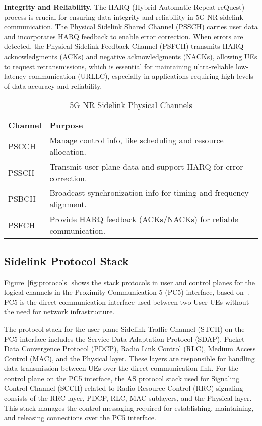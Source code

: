 \textbf{Integrity and Reliability.} The HARQ (Hybrid Automatic Repeat reQuest) process is crucial for ensuring data integrity and reliability in 5G NR sidelink communication. The Physical Sidelink Shared Channel (PSSCH) carries user data and incorporates HARQ feedback to enable error correction. When errors are detected, the Physical Sidelink Feedback Channel (PSFCH) transmits HARQ acknowledgments (ACKs) and negative acknowledgments (NACKs), allowing UEs to request retransmissions, which is essential for maintaining ultra-reliable low-latency communication (URLLC), especially in applications requiring high levels of data accuracy and reliability.

\begin{table}[t!]
\centering
\caption{5G NR Sidelink Physical Channels}
\begin{tabular}{|l|m{5.5cm}|}
\hline
\textbf{Channel} & \textbf{Purpose} \\
\hline
PSCCH & Manage control info, like scheduling and resource allocation. \\
\hline
PSSCH & Transmit user-plane data and support HARQ for error correction. \\
\hline
PSBCH & Broadcast synchronization info for timing and frequency alignment. \\
\hline
PSFCH & Provide HARQ feedback (ACKs/NACKs) for reliable communication. \\
\hline
\end{tabular} \label{tab:phy}
\end{table}

\subsection{Sidelink Protocol Stack} \label{sec:protocol}

Figure~\ref{fig:protocols} shows the stack protocols in user and control planes for the logical channels in the Proximity Communication 5 (PC5) interface, based on~\cite{3gpp.37.985}. PC5 is the direct communication interface used between two User UEs without the need for network infrastructure.

The protocol stack for the user-plane Sidelink Traffic Channel (STCH) on the PC5 interface includes the Service Data Adaptation Protocol (SDAP), Packet Data Convergence Protocol (PDCP), Radio Link Control (RLC), Medium Access Control (MAC), and the Physical layer. These layers are responsible for handling data transmission between UEs over the direct communication link. For the control plane on the PC5 interface, the AS protocol stack used for Signaling Control Channel (SCCH) related to Radio Resource Control (RRC) signaling consists of the RRC layer, PDCP, RLC, MAC sublayers, and the Physical layer. This stack manages the control messaging required for establishing, maintaining, and releasing connections over the PC5 interface.

